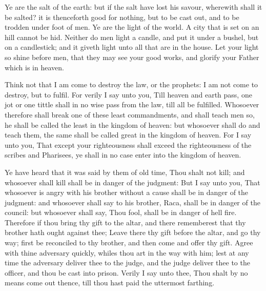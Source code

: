  Ye are the salt of the earth: but if the salt have lost
his savour, wherewith shall it be salted? it is thenceforth good for
nothing, but to be cast out, and to be trodden under foot of men.
 Ye are the light of the world. A city that is set on an
hill cannot be hid.  Neither do men light a candle, and
put it under a bushel, but on a candlestick; and it giveth light unto
all that are in the house.  Let your light so shine
before men, that they may see your good works, and glorify your Father
which is in heaven.

 Think not that I am come to destroy the law, or the
prophets: I am not come to destroy, but to fulfil.  For
verily I say unto you, Till heaven and earth pass, one jot or one tittle
shall in no wise pass from the law, till all be fulfilled.
 Whosoever therefore shall break one of these least
commandments, and shall teach men so, he shall be called the least in
the kingdom of heaven: but whosoever shall do and teach them, the same
shall be called great in the kingdom of heaven.  For I
say unto you, That except your righteousness shall exceed the
righteousness of the scribes and Pharisees, ye shall in no case enter
into the kingdom of heaven.

 Ye have heard that it was said by them of old time, Thou
shalt not kill; and whosoever shall kill shall be in danger of the
judgment:  But I say unto you, That whosoever is angry
with his brother without a cause shall be in danger of the judgment: and
whosoever shall say to his brother, Raca, shall be in danger of the
council: but whosoever shall say, Thou fool, shall be in danger of hell
fire.  Therefore if thou bring thy gift to the altar, and
there rememberest that thy brother hath ought against thee;
 Leave there thy gift before the altar, and go thy way;
first be reconciled to thy brother, and then come and offer thy gift.
 Agree with thine adversary quickly, whiles thou art in
the way with him; lest at any time the adversary deliver thee to the
judge, and the judge deliver thee to the officer, and thou be cast into
prison.  Verily I say unto thee, Thou shalt by no means
come out thence, till thou hast paid the uttermost farthing.


